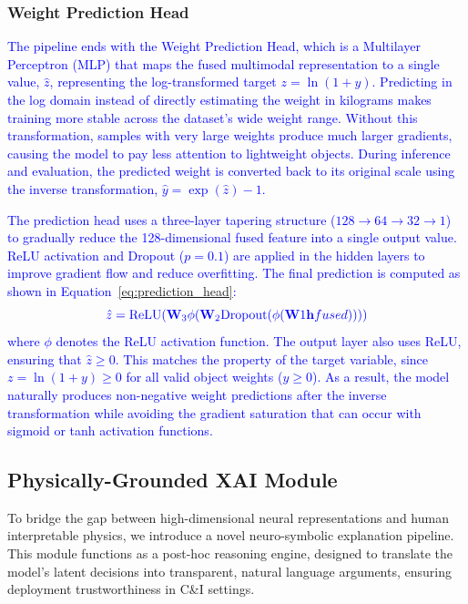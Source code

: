 \documentclass[journal,twoside,web]{ieeecolor}
\newcommand{\x}[1]{\textcolor{blue}{#1}}
\begin{document}
\subsubsection{Weight Prediction Head}
\x{The pipeline ends with the Weight Prediction Head, which is a Multilayer Perceptron (MLP) that maps the fused multimodal representation to a single value, $\hat{z}$, representing the log-transformed target $z=\ln(1+y)$. Predicting in the log domain instead of directly estimating the weight in kilograms makes training more stable across the dataset's wide weight range. Without this transformation, samples with very large weights produce much larger gradients, causing the model to pay less attention to lightweight objects. During inference and evaluation, the predicted weight is converted back to its original scale using the inverse transformation, $\hat{y}=\exp(\hat{z})-1$.}

\x{The prediction head uses a three-layer tapering structure ($128 \rightarrow 64 \rightarrow 32 \rightarrow 1$) to gradually reduce the 128-dimensional fused feature into a single output value. ReLU activation and Dropout ($p=0.1$) are applied in the hidden layers to improve gradient flow and reduce overfitting. The final prediction is computed as shown in Equation~\eqref{eq:prediction_head}:}
\begin{equation}
\color{blue}
\label{eq:prediction_head}
\hat{z} = \text{ReLU}(\mathbf{W}_3 \phi(\mathbf{W}_2 \text{Dropout}(\phi(\mathbf{W}1 \mathbf{h}{fused}))))
\end{equation}
\x{where $\phi$ denotes the ReLU activation function. The output layer also uses ReLU, ensuring that $\hat{z} \ge 0$. This matches the property of the target variable, since $z=\ln(1+y)\ge0$ for all valid object weights ($y\ge0$). As a result, the model naturally produces non-negative weight predictions after the inverse transformation while avoiding the gradient saturation that can occur with sigmoid or tanh activation functions.}

\subsection{Physically-Grounded XAI Module}

To bridge the gap between high-dimensional neural representations and human interpretable physics, we introduce a novel neuro-symbolic explanation pipeline. This module functions as a post-hoc reasoning engine, designed to translate the model's latent decisions into transparent, natural language arguments, ensuring deployment trustworthiness in C\&I settings.
\end{document}
